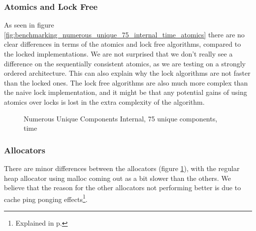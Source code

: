 \subsubsection{Atomics and Lock Free}
As seen in figure \ref{fig:benchmarking_numerous_unique_75_internal_time_atomics} there are no clear differences in terms of the atomics and lock free algorithms,
compared to the locked implementations.
We are not surprised that we don't really see a difference on the sequentially consistent atomics, as we are testing on a strongly ordered architecture.
This can also explain why the lock algorithms are not faster than the locked ones.
The lock free algorithms are also much more complex than the naive lock implementation,
and it might be that any potential gains of using atomics over locks is lost in the extra complexity of the algorithm.

\begin{figure}[htb]
\centering
{}
\caption{Numerous Unique Components Internal, 75 unique components, time}
\label{fig:benchmarking_numerous_unique_75_internal_time_allocators}
\end{figure}
\subsubsection{Allocators}
There are minor differences between the allocators (figure \ref{fig:benchmarking_numerous_unique_75_internal_time_allocators}), with the regular heap allocator
using malloc coming out as a bit slower than the others.
We believe that the reason for the other allocators not performing better is due
to cache ping ponging effects\footnote{Explained in p.\pageref{par:detailed_lock_free_ping_pong}}.

